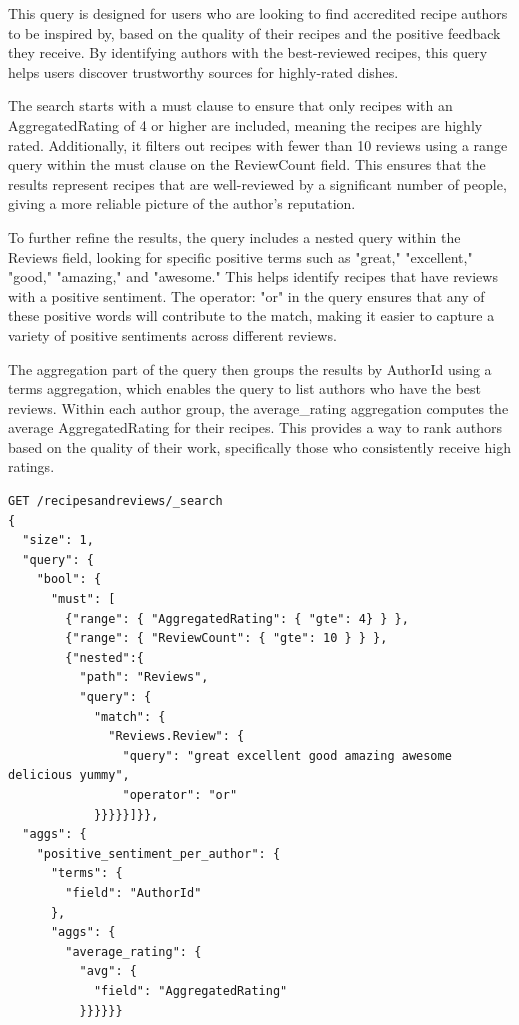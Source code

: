 \begin{enumerate}
    This query is designed for users who are looking to find accredited recipe authors to be inspired by, based on the quality of their recipes and the positive feedback they receive. By identifying authors with the best-reviewed recipes, this query helps users discover trustworthy sources for highly-rated dishes.

    The search starts with a must clause to ensure that only recipes with an AggregatedRating of 4 or higher are included, meaning the recipes are highly rated. Additionally, it filters out recipes with fewer than 10 reviews using a range query within the must clause on the ReviewCount field. This ensures that the results represent recipes that are well-reviewed by a significant number of people, giving a more reliable picture of the author's reputation.

    To further refine the results, the query includes a nested query within the Reviews field, looking for specific positive terms such as "great," "excellent," "good," "amazing," and "awesome." This helps identify recipes that have reviews with a positive sentiment. The operator: "or" in the query ensures that any of these positive words will contribute to the match, making it easier to capture a variety of positive sentiments across different reviews.

    The aggregation part of the query then groups the results by AuthorId using a terms aggregation, which enables the query to list authors who have the best reviews. Within each author group, the average\_rating aggregation computes the average AggregatedRating for their recipes. This provides a way to rank authors based on the quality of their work, specifically those who consistently receive high ratings.

    \begin{verbatim}
GET /recipesandreviews/_search
{
  "size": 1,
  "query": {
    "bool": {
      "must": [
        {"range": { "AggregatedRating": { "gte": 4} } },
        {"range": { "ReviewCount": { "gte": 10 } } },
        {"nested":{
          "path": "Reviews",
          "query": {
            "match": {
              "Reviews.Review": {
                "query": "great excellent good amazing awesome delicious yummy",
                "operator": "or"
            }}}}}]}},
  "aggs": {
    "positive_sentiment_per_author": {
      "terms": {
        "field": "AuthorId"
      },
      "aggs": {
        "average_rating": {
          "avg": {
            "field": "AggregatedRating"
          }}}}}}
    \end{verbatim}


\end{enumerate}
